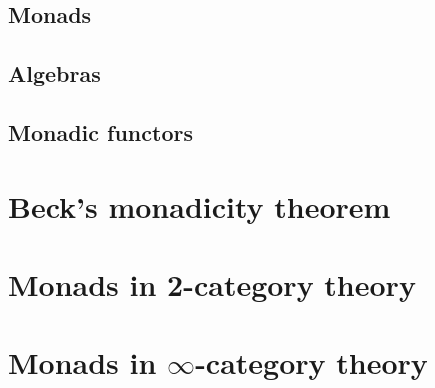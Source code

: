 \documentclass[a4paper,11pt,twoside, openany]{book}
\theoremstyle{definition}
\theoremstyle{definition}
\theoremstyle{remark}
\begin{document}
\section{Monads}
\section{Algebras}
\section{Monadic functors}
\chapter{Beck’s monadicity theorem}
\chapter{Monads in 2-category theory}
\chapter{Monads in $\infty$-category theory}




\backmatter
\end{document}
